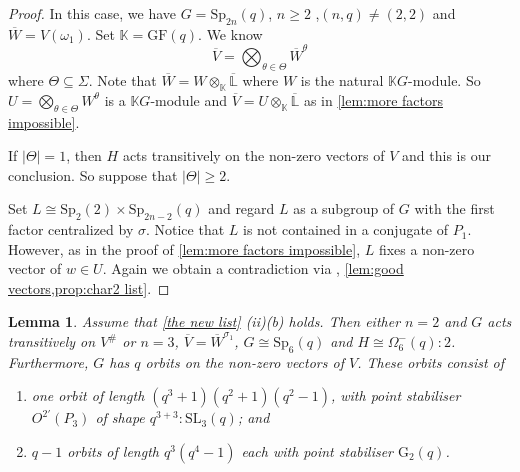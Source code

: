 \documentclass[12pt]{amsart}
\newtheorem{lemma}[theorem]{Lemma}
\theoremstyle{remark}
\theoremstyle{notation}
\theoremstyle{definition}
\newcommand{\GF}{\mathrm{GF}}
\newcommand{\Sp}{\mathrm{Sp}}
\newcommand{\SL}{\mathrm{SL}}
\newcommand{\0}{\emptyset}
\begin{document}
\begin{proof} In this case, we have $ G=\Sp_{2n}(q)$, $n \ge 2$ ,$(n,q) \ne (2,2)$ and  $\overline W= V(\omega_1)$. Set $\mathbb K= \GF(q)$.  We know    $$\overline{V}= \bigotimes_{\theta \in \Theta}\overline  W^{\theta}$$ where $\Theta \subseteq \Sigma$.
Note that $\overline W= W\otimes_{ \mathbb K} \overline{\mathbb L}$ where $W$ is the natural $\mathbb KG$-module.
So   $U=\bigotimes_{\theta \in \Theta} W^{\theta}$ is a $\mathbb KG$-module and $\overline V= U\otimes_{\mathbb K}\overline {\mathbb L}$ as in \cref{lem:more factors impossible}.

 If $|\Theta|=1$, then $H$ acts transitively on the non-zero vectors of $V$ and this is our conclusion. So suppose that $|\Theta|\ge 2$.

 Set $L \cong \Sp_2(2)\times \Sp_{2n-2}(q)$ and regard $L$ as a subgroup of $G$ with the first factor centralized by $\sigma$. Notice that
$L$ is not contained in a  conjugate of $P_1$. However, as in the proof of \cref{lem:more factors impossible}, $L$ fixes a non-zero vector of $w \in U$. Again we obtain a contradiction via \cite[Theorem A, Tables 1, 2 \& 3]{LiebeckPraegerSaxl},  \cref{lem:good vectors,prop:char2 list}.
\end{proof}



\begin{lemma}\label{spin symplectic}
Assume that \cref{the new list} (ii)(b) holds.  Then either $n=2$ and $G$ acts transitively on $V^\#$ or $n = 3$, $\overline V=\overline W^{\sigma_1}$, $G \cong \Sp_6(q)$ and $ H \cong \Omega_6^-(q){:} 2$.
 Furthermore,   $G$ has $q$ orbits on the non-zero vectors of $V$. These orbits consist of \begin{enumerate}\item one orbit  of length $(q^{3}+1)(q^2+1)(q^2-1)$, with  point stabiliser  $O^{2'}(P_3)$ of shape $ q^{3+3}{:}\SL_3(q)$; and\item $q-1$   orbits of length $q^{3}(q^{4}-1)$ each  with point
 stabiliser $\mathrm G_2(q)$.\end{enumerate}
\end{lemma}
\end{document}
